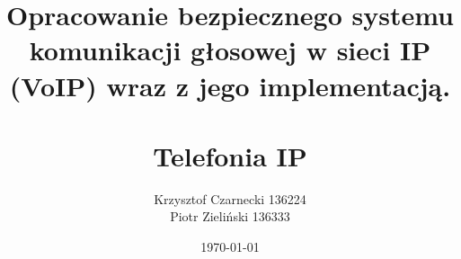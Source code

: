 \documentclass[12pt,a4paper]{article}
\begin{document}
    \title{Opracowanie bezpiecznego systemu komunikacji głosowej
    w sieci IP (VoIP) wraz z jego implementacją.
        \\ \\Telefonia IP}

    \author{Krzysztof Czarnecki 136224\\Piotr Zieliński 136333}
    \date{\today}
    \maketitle

    \newpage
    \tableofcontents

    
    
    
    
\end{document}
